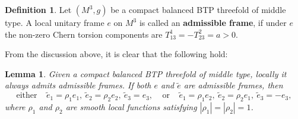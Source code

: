 \documentclass{amsart}
\numberwithin{equation}{section}
\newtheorem{lemma}  [theorem]     {Lemma}
\theoremstyle{definition}
\newtheorem{definition}  [theorem]     {Definition}
\renewcommand{\1}{\mathds{1}}
\renewcommand{\>}{\rightarrow}
\begin{document}
\begin{definition} \label{def9.2}
Let $(M^3,g)$ be a compact balanced BTP threefold of middle type. A local unitary frame $e$ on $M^3$ is called an {\bf admissible frame},
if under $e$ the non-zero Chern torsion components are $T^1_{13}=-T^2_{23}=a>0$.
\end{definition}

From the discussion above, it is clear that the following hold:

\begin{lemma} \label{claim9.1b}
 Given a compact balanced BTP threefold of middle type, locally it always admits admissible frames. If both $e$ and $\tilde{e}$ are admissible frames, then $$ \mbox{either} \ \ \ \ \ \tilde{e}_1=\rho_1 e_1, \ \tilde{e}_2=\rho_2 e_2, \ \tilde{e}_3= e_3, \ \ \ \ \ \mbox{or} \ \  \ \ \ \tilde{e}_1=\rho_1 e_2, \ \tilde{e}_2=\rho_2 e_1,  \ \tilde{e}_3= -e_3, $$
 where  $\rho_1$ and $\rho_2$ are smooth local functions satisfying $|\rho_1|=|\rho_2|=1$.
 \end{lemma}
\end{document}
